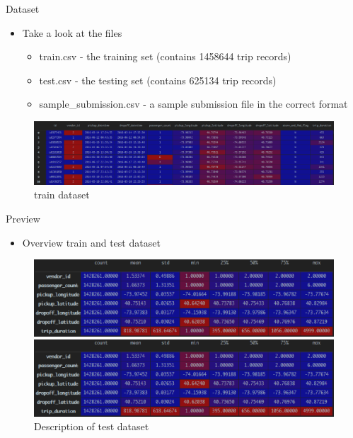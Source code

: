 \documentclass[
 size=12pt,
 paper=smartboard, %
 mode=present, %
 display=slides, %
style=tuliplab,
pauseslide,
fleqn,leqno]{powerdot}
\begin{document}
\begin{slide}{Dataset}
  \begin{itemize}
    \item Take a look at the files
      \begin{itemize}
        \item train.csv - the training set (contains 1458644 trip records)
        \item test.csv - the testing set (contains 625134 trip records)
        \item sample_submission.csv - a sample submission file in the correct format
      \end{itemize}
  \end{itemize}
  \pause
  \begin{figure}[h]
    \centering
    \includegraphics[width=1.0\textwidth]{figures2/train_data.eps}
    \caption{train dataset}
    \label{fig:train-dataset}
  \end{figure}
\end{slide}

\begin{slide}{Preview}
  \begin{itemize}
    \item Overview train and test dataset
  \end{itemize}
  \pause
  \begin{figure}[v]
    \begin{minipage}[t]{0.8\linewidth}
      \centering
      \includegraphics[width=1.0\textwidth]{figures2/train_data_desc.eps}
      \caption{Description of train dataset}
      \label{fig:categories-picture}
    \end{minipage} \pause
    \vfill 
    \begin{minipage}[t]{0.8\linewidth}
      \centering
      \includegraphics[width=1.0\textwidth]{figures2/test_data_desc.eps}
      \caption{Description of test dataset}
      \label{fig:pic-label1}
    \end{minipage}
  \end{figure}
\end{slide}
\end{document}

